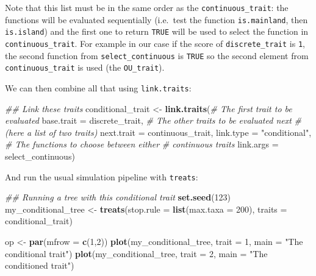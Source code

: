 \documentclass[
]{book}
\newenvironment{Shaded}{\begin{snugshade}}{\end{snugshade}}
\newcommand{\CommentTok}[1]{\textcolor[rgb]{0.56,0.35,0.01}{\textit{#1}}}
\newcommand{\DataTypeTok}[1]{\textcolor[rgb]{0.13,0.29,0.53}{#1}}
\newcommand{\DecValTok}[1]{\textcolor[rgb]{0.00,0.00,0.81}{#1}}
\newcommand{\KeywordTok}[1]{\textcolor[rgb]{0.13,0.29,0.53}{\textbf{#1}}}
\newcommand{\NormalTok}[1]{#1}
\newcommand{\StringTok}[1]{\textcolor[rgb]{0.31,0.60,0.02}{#1}}
\begin{document}
Note that this list must be in the same order as the \texttt{continuous\_trait}: the functions will be evaluated sequentially (i.e.~test the function \texttt{is.mainland}, then \texttt{is.island}) and the first one to return \texttt{TRUE} will be used to select the function in \texttt{continuous\_trait}.
For example in our case if the score of \texttt{discrete\_trait} is \texttt{1}, the second function from \texttt{select\_continuous} is \texttt{TRUE} so the second element from \texttt{continuous\_trait} is used (the \texttt{OU\_trait}).

We can then combine all that using \texttt{link.traits}:

\begin{Shaded}
\begin{Highlighting}[]
\CommentTok{\#\# Link these traits}
\NormalTok{conditional\_trait \textless{}{-}}\StringTok{ }\KeywordTok{link.traits}\NormalTok{(}\CommentTok{\# The first trait to be evaluated}
                                 \DataTypeTok{base.trait =}\NormalTok{ discrete\_trait,}
                                 \CommentTok{\# The other traits to be evaluated next}
                                 \CommentTok{\# (here a list of two traits)}
                                 \DataTypeTok{next.trait =}\NormalTok{ continuous\_trait,}
                                 \DataTypeTok{link.type  =} \StringTok{"conditional"}\NormalTok{,}
                                 \CommentTok{\# The functions to choose between either}
                                 \CommentTok{\# continuous traits }
                                 \DataTypeTok{link.args  =}\NormalTok{ select\_continuous)}
\end{Highlighting}
\end{Shaded}

And run the usual simulation pipeline with \texttt{treats}:

\begin{Shaded}
\begin{Highlighting}[]
\CommentTok{\#\# Running a tree with this conditional trait}
\KeywordTok{set.seed}\NormalTok{(}\DecValTok{123}\NormalTok{)}
\NormalTok{my\_conditional\_tree \textless{}{-}}\StringTok{ }\KeywordTok{treats}\NormalTok{(}\DataTypeTok{stop.rule =} \KeywordTok{list}\NormalTok{(}\DataTypeTok{max.taxa =} \DecValTok{200}\NormalTok{),}
                              \DataTypeTok{traits    =}\NormalTok{ conditional\_trait)}

\NormalTok{op \textless{}{-}}\StringTok{ }\KeywordTok{par}\NormalTok{(}\DataTypeTok{mfrow =} \KeywordTok{c}\NormalTok{(}\DecValTok{1}\NormalTok{,}\DecValTok{2}\NormalTok{))}
\KeywordTok{plot}\NormalTok{(my\_conditional\_tree, }\DataTypeTok{trait =} \DecValTok{1}\NormalTok{, }\DataTypeTok{main =} \StringTok{"The conditional trait"}\NormalTok{)}
\KeywordTok{plot}\NormalTok{(my\_conditional\_tree, }\DataTypeTok{trait =} \DecValTok{2}\NormalTok{, }\DataTypeTok{main =} \StringTok{"The conditioned trait"}\NormalTok{)}
\end{Highlighting}
\end{Shaded}
\end{document}
